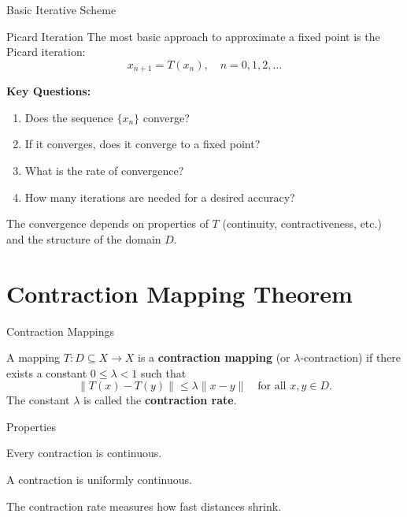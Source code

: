 \documentclass[aspectratio=169,10pt]{beamer}
\begin{document}
\begin{frame}{Basic Iterative Scheme}
  \begin{block}{Picard Iteration}
    The most basic approach to approximate a fixed point is the Picard iteration:
    \[
      x_{n+1} = T(x_n), \quad n = 0, 1, 2, \ldots
    \]
  \end{block}

  \vspace{0.4cm}

  \textbf{Key Questions:}
  \begin{enumerate}
    \item Does the sequence $\{x_n\}$ converge?
    \item If it converges, does it converge to a fixed point?
    \item What is the rate of convergence?
    \item How many iterations are needed for a desired accuracy?
  \end{enumerate}

  \vspace{0.4cm}

  \begin{remark}
    The convergence depends on properties of $T$ (continuity, contractiveness, etc.)
    and the structure of the domain $D$.
  \end{remark}
\end{frame}

\section{Contraction Mapping Theorem}

\begin{frame}{Contraction Mappings}
  \begin{definition}
    A mapping $T: D \subseteq X \to X$ is a \textbf{contraction mapping} (or $\lambda$-contraction)
    if there exists a constant $0 \leq \lambda < 1$ such that
    \[
      \|T(x) - T(y)\| \leq \lambda \|x - y\|
      \quad \text{for all } x, y \in D.
    \]
    The constant $\lambda$ is called the \textbf{contraction rate}.
  \end{definition}

  \vspace{0.4cm}

  \begin{block}{Properties}
    \item Every contraction is continuous.
    \item A contraction is uniformly continuous.
    \item The contraction rate measures how fast distances shrink.
  \end{block}
\end{frame}
\end{document}
